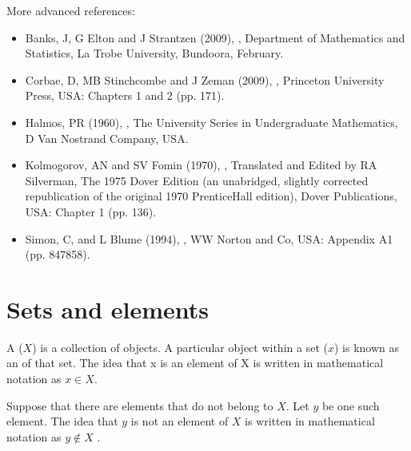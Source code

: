 \documentclass[letterpaper,10pt,english]{jupyterBook}
\begin{document}
\sphinxAtStartPar
More advanced references:
\begin{itemize}
\item {} 
\sphinxAtStartPar
Banks, J, G Elton and J Strantzen (2009), , Department of Mathematics and Statistics, La Trobe University, Bundoora, February.

\item {} 
\sphinxAtStartPar
Corbae, D, MB Stinchcombe and J Zeman (2009), , Princeton University Press, USA: Chapters 1 and 2 (pp. 1\sphinxhyphen{}71).

\item {} 
\sphinxAtStartPar
Halmos, PR (1960), , The University Series in Undergraduate Mathematics, D Van Nostrand Company, USA.

\item {} 
\sphinxAtStartPar
Kolmogorov, AN and SV Fomin (1970), , Translated and Edited by RA Silverman, The 1975 Dover Edition (an unabridged, slightly corrected republication of the original 1970 Prentice\sphinxhyphen{}Hall edition), Dover Publications, USA: Chapter 1 (pp. 1\sphinxhyphen{}36).

\item {} 
\sphinxAtStartPar
Simon, C, and L Blume (1994), , WW Norton and Co, USA: Appendix A1 (pp. 847\sphinxhyphen{}858).

\end{itemize}


\section{Sets and elements}
\label{\detokenize{02.sets_numbers_coordinates_distances:sets-and-elements}}
\sphinxAtStartPar
A  (\(X\)) is a collection of objects. A particular object within a set (\(x\)) is known as an  of that set. The idea that x is an element of X is written in mathematical notation as \(x \in X\).

\sphinxAtStartPar
Suppose that there are elements that do not belong to \(X\). Let \(y\) be one such element. The idea that \(y\) is not an element of \(X\) is written in mathematical
notation as \(y \notin X\) .
\end{document}
